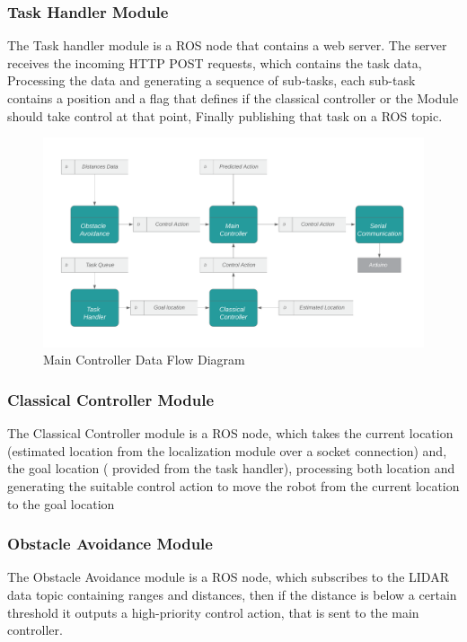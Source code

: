 \subsubsection{Task Handler Module }
\hspace{2cm}The Task handler module is a ROS node that contains a web server. The server receives the incoming HTTP POST requests, which contains the task data, Processing the data and generating a sequence of sub-tasks, each sub-task contains a position and a flag that defines if the classical controller or the Module should take control at that point, Finally publishing that task on a ROS topic.
\begin{figure}[H]%
    \center%
    \includegraphics[width=.8\textwidth]{images/Dada/DataFlowDiagram.png}%
    \caption[Main Controller Data Flow Diagram]{Main Controller Data Flow Diagram}\label{fig: Main Controller Data Flow Diagram}%
  \end{figure}
\subsubsection{Classical Controller Module}
\hspace{2cm}The Classical Controller module is a ROS node, which takes the current location (estimated location from the localization module over a socket connection) and, the goal location ( provided from the task handler),  processing both location and generating the suitable control action to move the robot from the current location to the goal location
\subsubsection{Obstacle Avoidance Module}
\hspace{2cm}The Obstacle Avoidance module is a ROS node, which subscribes to the LIDAR data topic containing ranges and distances, then if the distance is below a certain threshold it outputs a high-priority control action, that is sent to the main controller.
